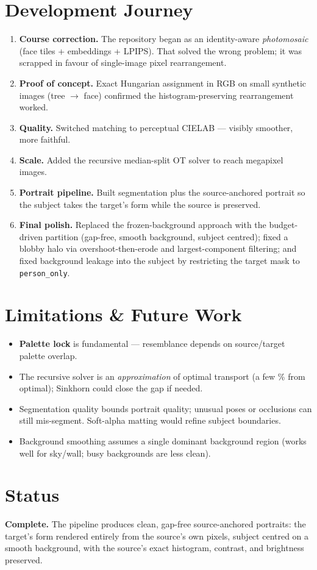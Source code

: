 \documentclass[11pt,a4paper]{article}
\begin{document}
\section{Development Journey}
\begin{enumerate}[leftmargin=1.6em]
  \item \textbf{Course correction.} The repository began as an identity-aware
  \emph{photomosaic} (face tiles + embeddings + LPIPS). That solved the wrong problem; it was
  scrapped in favour of single-image pixel rearrangement.
  \item \textbf{Proof of concept.} Exact Hungarian assignment in RGB on small synthetic images
  (tree $\rightarrow$ face) confirmed the histogram-preserving rearrangement worked.
  \item \textbf{Quality.} Switched matching to perceptual CIELAB --- visibly smoother, more
  faithful.
  \item \textbf{Scale.} Added the recursive median-split OT solver to reach megapixel images.
  \item \textbf{Portrait pipeline.} Built segmentation plus the source-anchored portrait so the
  subject takes the target's form while the source is preserved.
  \item \textbf{Final polish.} Replaced the frozen-background approach with the budget-driven
  partition (gap-free, smooth background, subject centred); fixed a blobby halo via
  overshoot-then-erode and largest-component filtering; and fixed background leakage into the
  subject by restricting the target mask to \texttt{person\_only}.
\end{enumerate}

\section{Limitations \& Future Work}
\begin{itemize}[leftmargin=1.4em]
  \item \textbf{Palette lock} is fundamental --- resemblance depends on source/target palette
  overlap.
  \item The recursive solver is an \emph{approximation} of optimal transport (a few \% from
  optimal); Sinkhorn could close the gap if needed.
  \item Segmentation quality bounds portrait quality; unusual poses or occlusions can still
  mis-segment. Soft-alpha matting would refine subject boundaries.
  \item Background smoothing assumes a single dominant background region (works well for
  sky/wall; busy backgrounds are less clean).
\end{itemize}

\section{Status}
\textbf{Complete.} The pipeline produces clean, gap-free source-anchored portraits: the
target's form rendered entirely from the source's own pixels, subject centred on a smooth
background, with the source's exact histogram, contrast, and brightness preserved.
\end{document}
